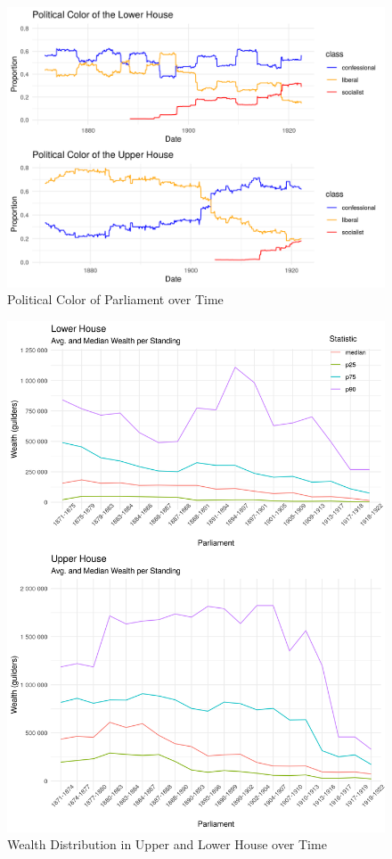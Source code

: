 \begin{landscape}

\begin{figure}
    \centering
    \includegraphics[scale=0.80]{figures/step4comp.png}
    \caption{Political Color of Parliament over Time}
    \label{fig:parltime}
\end{figure}

\end{landscape}
\clearpage

\begin{figure}
    \centering
    \includegraphics[scale=0.8]{figures/step5fig2wealthperparl.png}
    \caption{Wealth Distribution in Upper and Lower House over Time}
    \label{fig:avgwealthtime}
\end{figure}
\clearpage

